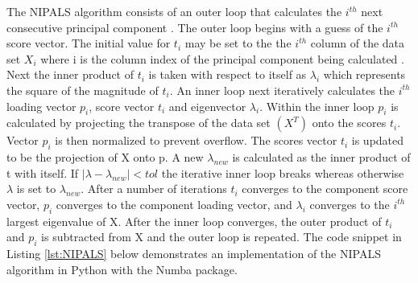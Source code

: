 \documentclass[12pt]{article}
\begin{document}
The NIPALS algorithm consists of an outer loop that calculates the $i^{th}$ next consecutive principal component . The outer loop begins with a guess of the $i^{th}$ score  vector. The initial value for $t_i$ may be set to the the $i^{th}$ column of the data set $X_i$ where i is the column index of the principal component being calculated \cite{risvik2007principal}. Next the inner product of $t_i$ is taken with respect to itself as $\lambda_i$ which represents the square of the magnitude of $t_i$. An inner loop next iteratively calculates the $i^{th}$ loading vector $p_i$, score vector $t_i$ and eigenvector $\lambda_i$. Within the inner loop $p_i$ is calculated by projecting the transpose of the data set $(X^T)$ onto the scores $t_i$. Vector $p_i$ is then normalized to prevent overflow. The scores vector $t_i$ is updated to be the projection of X onto p. A new $\lambda_{new}$ is calculated as the inner product of t with itself. If $|\lambda-\lambda_{new}|<tol$ the iterative inner loop breaks whereas otherwise $\lambda$ is set to $\lambda_{new}$.  After a number of iterations $t_i$ converges to the component score vector, $p_i$ converges to the component loading vector, and $\lambda_i$ converges to the $i^{th}$ largest eigenvalue of X. After the inner loop converges, the outer product of $t_i$ and $p_i$ is subtracted from X and the outer loop is repeated. The code snippet in Listing \ref{lst:NIPALS} below demonstrates an implementation of the NIPALS algorithm in Python with the Numba \cite{numba} package.
\end{document}
